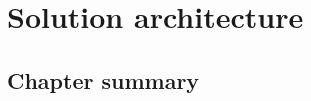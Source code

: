 \chapter{Solution architecture} \label{chap:solution}

\section*{}


\section{\evm} \label{sec:solution:evm}

\section{Chapter summary}
